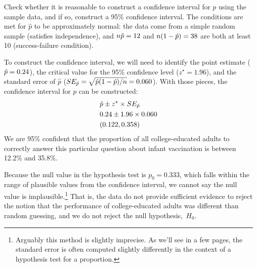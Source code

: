 \begin{examplewrap}
\begin{nexample}{Check whether it is reasonable to construct
    a confidence interval for $p$ using the sample data, and
    if so, construct a 95\% confidence interval.}
  The conditions are met for $\hat{p}$ to be approximately
  normal: the data come from a simple random sample (satisfies
  independence), and $n\hat{p} = 12$ and
  $n(1 - \hat{p}) = 38$ are both
  at least 10 (success-failure condition).

  To construct the confidence interval, we will need to identify
  the point estimate ($\hat{p} = 0.24$),
  the critical value for
  the 95\% confidence level ($z^{\star} = 1.96$), and the standard
  error of $\hat{p}$
  ($SE_{\hat{p}} = \sqrt{\hat{p}(1 - \hat{p}) / n} = 0.060$).
  With those pieces, the confidence interval for $p$ can be
  constructed:
  \begin{align*}
    &\hat{p} \pm z^{\star} \times SE_{\hat{p}} \\
    &0.24 \pm 1.96 \times 0.060 \\
    &(0.122, 0.358)
  \end{align*}
  We are 95\% confident that the proportion of all
  college-educated adults to correctly answer this
  particular question about infant vaccination is between
  12.2\% and 35.8\%.
\end{nexample}
\end{examplewrap}

Because the null value in the hypothesis test is $p_0 = 0.333$,
which falls within the range of plausible values from the
confidence interval, we cannot say the null value is
implausible.\footnote{Arguably this method is slightly imprecise.
  As we'll see in a few pages, the standard error is often
  computed slightly differently in the context of a hypothesis
  test for a proportion.}
That is, the data do not provide sufficient evidence to reject
the notion that the performance of college-educated
adults was different than random guessing,
and we do not reject the null hypothesis,~$H_0$.

